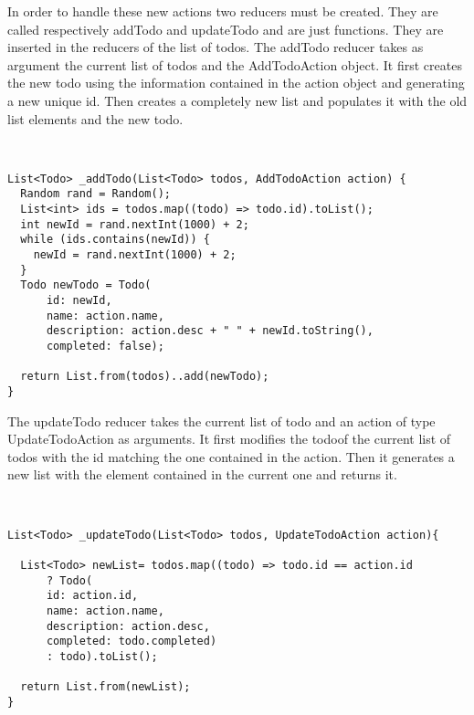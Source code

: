In order to handle these new actions two reducers must be created. They are called respectively addTodo and updateTodo and are just functions. They are inserted in the reducers of the list of todos. The addTodo reducer takes as argument the current list of todos and the AddTodoAction object. It first creates the new todo using the information contained in the action object and generating a new unique id. Then creates a completely new list and populates it with the old list elements and the new todo.
\begin{code}
\mbox{}\\
 \mbox{}
		\label{code:2.14}
\begin{verbatim}
List<Todo> _addTodo(List<Todo> todos, AddTodoAction action) {
  Random rand = Random();
  List<int> ids = todos.map((todo) => todo.id).toList();
  int newId = rand.nextInt(1000) + 2;
  while (ids.contains(newId)) {
    newId = rand.nextInt(1000) + 2;
  }
  Todo newTodo = Todo(
      id: newId,
      name: action.name,
      description: action.desc + " " + newId.toString(),
      completed: false);

  return List.from(todos)..add(newTodo);
}
\end{verbatim}
\mbox{}
\end{code}

The updateTodo reducer takes the current list of todo and an action of type UpdateTodoAction as arguments.  It first modifies the todoof the current list of todos with the id matching the one contained in the action. Then it generates a new list with the element contained in the current one and returns it.
\begin{code}
\mbox{}\\
 \mbox{}
		\label{code:2.14}
\begin{verbatim}
List<Todo> _updateTodo(List<Todo> todos, UpdateTodoAction action){

  List<Todo> newList= todos.map((todo) => todo.id == action.id
      ? Todo(
      id: action.id,
      name: action.name,
      description: action.desc,
      completed: todo.completed)
      : todo).toList();

  return List.from(newList);
}
\end{verbatim}
\mbox{}
\end{code}

